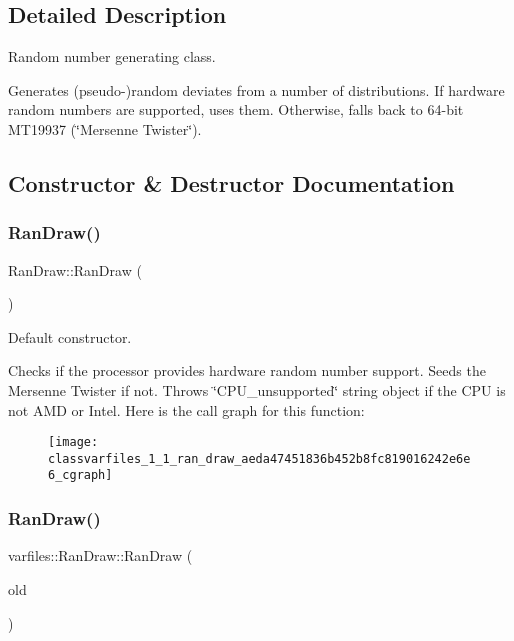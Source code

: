 \subsection{Detailed Description}
Random number generating class. 

Generates (pseudo-\/)random deviates from a number of distributions. If hardware random numbers are supported, uses them. Otherwise, falls back to 64-\/bit M\+T19937 (\char`\"{}\+Mersenne Twister\char`\"{}). 

\subsection{Constructor \& Destructor Documentation}
\mbox{\label{classvarfiles_1_1_ran_draw_aeda47451836b452b8fc819016242e6e6}} 
\subsubsection{\texorpdfstring{Ran\+Draw()}{RanDraw()}\hspace{0.1cm}{\footnotesize\ttfamily [1/3]}}
{\footnotesize\ttfamily Ran\+Draw\+::\+Ran\+Draw (\begin{DoxyParamCaption}{ }\end{DoxyParamCaption})}



Default constructor. 

Checks if the processor provides hardware random number support. Seeds the Mersenne Twister if not. Throws \char`\"{}\+C\+P\+U\+\_\+unsupported\char`\"{} string object if the C\+PU is not A\+MD or Intel. Here is the call graph for this function\+:\nopagebreak
\begin{figure}[H]
\begin{center}
\leavevmode
\texttt{[image: classvarfiles\_1\_1\_ran\_draw\_aeda47451836b452b8fc819016242e6e6\_cgraph]}
\end{center}
\end{figure}
\mbox{\label{classvarfiles_1_1_ran_draw_a93397b17c6615fe3166a065a1667401f}} 
\subsubsection{\texorpdfstring{Ran\+Draw()}{RanDraw()}\hspace{0.1cm}{\footnotesize\ttfamily [2/3]}}
{\footnotesize\ttfamily varfiles\+::\+Ran\+Draw\+::\+Ran\+Draw (\begin{DoxyParamCaption}\item[{const \hyperlink{classvarfiles_1_1_ran_draw}{Ran\+Draw} \&}]{old }\end{DoxyParamCaption})\hspace{0.3cm}{\ttfamily [default]}}



